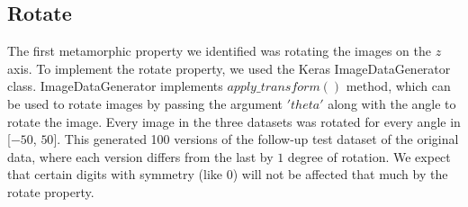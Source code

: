 \subsection{Rotate}
The first metamorphic property we identified was rotating the images on the $z$ axis. To implement the rotate property, we used the Keras ImageDataGenerator class. ImageDataGenerator implements $apply\_transform()$ method, which can be used to rotate images by passing the argument $'theta'$ along with the angle to rotate the image. Every image in the three datasets was rotated for every angle in [$-50$, $50$]. This generated 100 versions of the follow-up test dataset of the original data, where each version differs from the last by $1$ degree of rotation. We expect that certain digits with symmetry (like $0$) will not be affected that much by the rotate property. 
